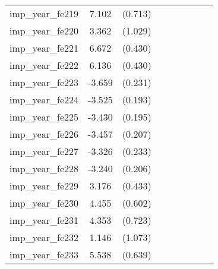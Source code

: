 {\begin{tabular}{l*{4}{cc}}
imp\_year\_fe219&    7.102\sym{***}&  (0.713)&                  &         &                  &         &                  &         \\
imp\_year\_fe220&    3.362\sym{**} &  (1.029)&                  &         &                  &         &                  &         \\
imp\_year\_fe221&    6.672\sym{***}&  (0.430)&                  &         &                  &         &                  &         \\
imp\_year\_fe222&    6.136\sym{***}&  (0.430)&                  &         &                  &         &                  &         \\
imp\_year\_fe223&   -3.659\sym{***}&  (0.231)&                  &         &                  &         &                  &         \\
imp\_year\_fe224&   -3.525\sym{***}&  (0.193)&                  &         &                  &         &                  &         \\
imp\_year\_fe225&   -3.430\sym{***}&  (0.195)&                  &         &                  &         &                  &         \\
imp\_year\_fe226&   -3.457\sym{***}&  (0.207)&                  &         &                  &         &                  &         \\
imp\_year\_fe227&   -3.326\sym{***}&  (0.233)&                  &         &                  &         &                  &         \\
imp\_year\_fe228&   -3.240\sym{***}&  (0.206)&                  &         &                  &         &                  &         \\
imp\_year\_fe229&    3.176\sym{***}&  (0.433)&                  &         &                  &         &                  &         \\
imp\_year\_fe230&    4.455\sym{***}&  (0.602)&                  &         &                  &         &                  &         \\
imp\_year\_fe231&    4.353\sym{***}&  (0.723)&                  &         &                  &         &                  &         \\
imp\_year\_fe232&    1.146         &  (1.073)&                  &         &                  &         &                  &         \\
imp\_year\_fe233&    5.538\sym{***}&  (0.639)&                  &         &                  &         &                  &         \\

\end{tabular}}
